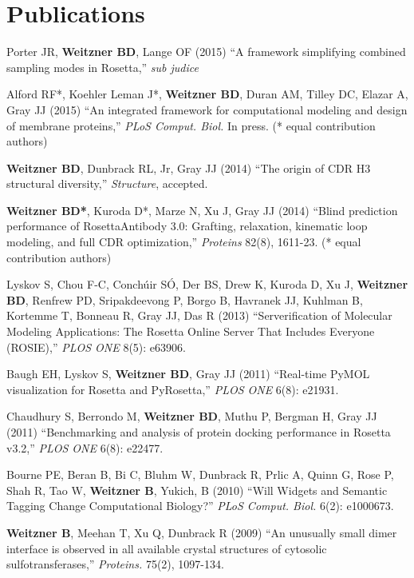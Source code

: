\documentclass[11pt]{article}
\newcommand{\allcapsspacing}[1]{{\addfontfeature{LetterSpace=7.5}#1}}
\begin{document}
\section*{\allcapsspacing{Publications}}
\begin{etaremune}
\item Porter JR, \textbf{Weitzner BD}, Lange OF (2015) ``A framework simplifying combined sampling modes in Rosetta,'' \textit{sub judice}
\item Alford RF*, Koehler Leman J*, \textbf{Weitzner BD}, Duran AM, Tilley DC, Elazar A, Gray JJ (2015) ``An integrated framework for computational modeling and design of membrane proteins,'' \textit{PLoS Comput. Biol.} In press. (* equal contribution authors)
\item \textbf{Weitzner BD}, Dunbrack RL, Jr, Gray JJ (2014) ``The origin of CDR H3 structural diversity,'' \textit{Structure}, accepted.
\item \textbf{Weitzner BD*}, Kuroda D*, Marze N, Xu J, Gray JJ (2014) ``Blind prediction performance of RosettaAntibody 3.0: Grafting, relaxation, kinematic loop modeling, and full CDR optimization,'' \textit{Proteins} 82(8), 1611-23. (* equal contribution authors)
\item Lyskov S, Chou F-C, Conch{\'u}ir S{\'O}, Der BS, Drew K, Kuroda D, Xu J, \textbf{Weitzner BD}, Renfrew PD, Sripakdeevong P, Borgo B, Havranek JJ, Kuhlman B, Kortemme T, Bonneau R, Gray JJ, Das R (2013) ``Serverification of Molecular Modeling Applications: The Rosetta Online Server That Includes Everyone (ROSIE),'' \textit{PLOS ONE} 8(5): e63906.
\item Baugh EH, Lyskov S, \textbf{Weitzner BD}, Gray JJ (2011) ``Real-time PyMOL visualization for Rosetta and PyRosetta,'' \textit{PLOS ONE} 6(8): e21931.
\item Chaudhury S, Berrondo M, \textbf{Weitzner BD}, Muthu P, Bergman H, Gray JJ (2011) ``Benchmarking and analysis of protein docking performance in Rosetta v3.2,'' \textit{PLOS ONE} 6(8): e22477.
\item Bourne PE, Beran B, Bi C, Bluhm W, Dunbrack R, Prlic A, Quinn G, Rose P, Shah R, Tao W, \textbf{Weitzner B}, Yukich, B (2010) ``Will Widgets and Semantic Tagging Change Computational Biology?'' \textit{PLoS Comput. Biol.} 6(2): e1000673.
\item \textbf{Weitzner B}, Meehan T, Xu Q, Dunbrack R (2009) ``An unusually small dimer interface is observed in all available crystal structures of cytosolic sulfotransferases,'' \textit{Proteins.} 75(2), 1097-134.
\end{etaremune}
\end{document}
